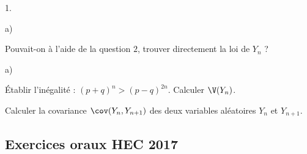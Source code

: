 \begin{exerciceAP}
\begin{noliste}{1.}
\begin{noliste}{a)}
    \item Pouvait-on à l'aide de la question $2$, trouver 
    directement la loi de $Y_n$ ?
  \end{noliste}
  
  \item 
  \begin{noliste}{a)}
    \setlength{\itemsep}{2mm}
    \item Établir l'inégalité : $(p+q)^n > (p-q)^{2n}$. Calculer 
    $\V(Y_n)$.
    
    \item Calculer la covariance $\cov(Y_n,Y_{n+1})$ des deux 
    variables aléatoires $Y_n$ et $Y_{n+1}$.
  \end{noliste}
\end{noliste}
\end{exerciceAP} 


\subsection*{Exercices oraux HEC 2017}


